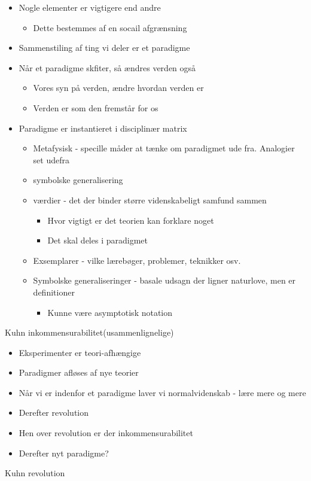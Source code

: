 \documentclass[11pt]{article}
\begin{document}
\begin{itemize}
\item Nogle elementer er vigtigere end andre
\begin{itemize}
\item Dette bestemmes af en socail afgrænsning
\end{itemize}
\item Sammenstiling af ting vi deler er et paradigme
\item Når et paradigme skfiter, så ændres verden også
\begin{itemize}
\item Vores syn på verden, ændre hvordan verden er
\item Verden er som den fremstår for os
\end{itemize}
\item Paradigme er instantieret i disciplinær matrix
\begin{itemize}
\item Metafysisk - specille måder at tænke om paradigmet ude fra. Analogier set udefra
\item symbolske generalisering
\item værdier - det der binder større videnskabeligt samfund sammen
\begin{itemize}
\item Hvor vigtigt er det teorien kan forklare noget
\item Det skal deles i paradigmet
\end{itemize}
\item Exsemplarer - vilke lærebøger, problemer, teknikker osv.
\item Symbolske generaliseringer - basale udsagn der ligner naturlove, men er definitioner
\begin{itemize}
\item Kunne være asymptotisk notation
\end{itemize}
\end{itemize}
\end{itemize}

Kuhn inkommensurabilitet(usammenlignelige)
\begin{itemize}
\item Eksperimenter er teori-afhængige
\item Paradigmer afløses af nye teorier
\item Når vi er indenfor et paradigme laver vi normalvidenskab - lære mere og mere
\item Derefter revolution
\item Hen over revolution er der inkommensurabilitet
\item Derefter nyt paradigme?
\end{itemize}
Kuhn revolution
\end{document}
